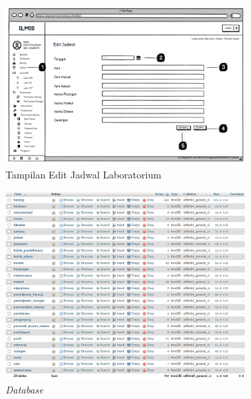 \begin{figure}
	\centering
	\includegraphics[width=0.82\textwidth]{konten/gambar/user interface/edit-jadwal.png}
	\caption{Tampilan Edit Jadwal Laboratorium}
	\label{fig:edit-jadwal-interface}
\end{figure}

\begin{figure}
	\centering
	\includegraphics[width=0.82\textwidth]{konten/gambar/implementasi/database.png}
	\caption{\textit{Database}}
	\label{database-manlab}
\end{figure}

